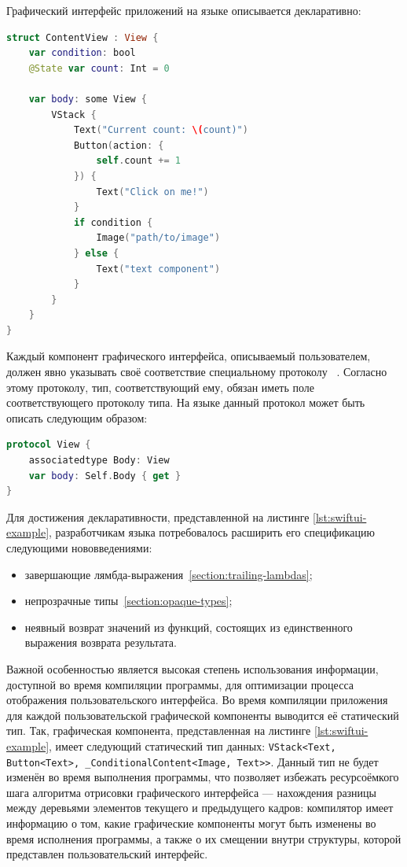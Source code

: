Графический интерфейс приложений на языке 
описывается декларативно:
\begin{lstlisting}[language=Swift,caption=Счётчик нажатия кнопки на языке
\name{SwiftUI},label={lst:swiftui-example}]
struct ContentView : View {
    var condition: bool
    @State var count: Int = 0
	
    var body: some View {
        VStack {
            Text("Current count: \(count)")
            Button(action: {
                self.count += 1
            }) {
                Text("Click on me!")
            }
            if condition {
                Image("path/to/image")
            } else {
                Text("text component")
            }
        }
    }
}
\end{lstlisting}
Каждый компонент графического интерфейса, описываемый пользователем, должен
явно указывать своё соответствие специальному
протоколу~\cite{swift-protocols-doc} . Согласно этому протоколу,
тип, соответствующий ему, обязан иметь поле  соответствующего
протоколу  типа. На языке  данный
протокол может быть описать следующим образом:
\begin{lstlisting}[language=Swift, caption=Реализация протокола \name{View}
на языке \name{Swift}]
protocol View {
    associatedtype Body: View
    var body: Self.Body { get }
}
\end{lstlisting}

Для достижения декларативности, представленной на листинге
\ref{lst:swiftui-example}, разработчикам языка  потребовалось
расширить его спецификацию следующими нововведениями:
\begin{itemize}
	\item завершающие лямбда-выражения~\ref{section:trailing-lambdas};
	\item непрозрачные типы~\ref{section:opaque-types};
	\item неявный возврат значений из функций, состоящих из единственного
	выражения возврата результата.
\end{itemize}

Важной особенностью  является высокая степень использования
информации, доступной во время компиляции программы, для оптимизации
процесса отображения пользовательского интерфейса. Во время компиляции
приложения для каждой пользовательской графической компоненты выводится
её статический тип. Так, графическая компонента, представленная на листинге
\ref{lst:swiftui-example}, имеет следующий статический тип данных:\newline
\texttt{VStack<Text, Button<Text>, \_ConditionalContent<Image, Text>>}.
Данный тип не будет изменён во время выполнения программы, что позволяет
избежать ресурсоёмкого шага алгоритма отрисовки графического интерфейса
--- нахождения разницы между деревьями элементов текущего и предыдущего
кадров: компилятор имеет информацию о том, какие графические компоненты
могут быть изменены во время исполнения программы, а также о их смещении
внутри структуры, которой представлен пользовательский интерфейс.


